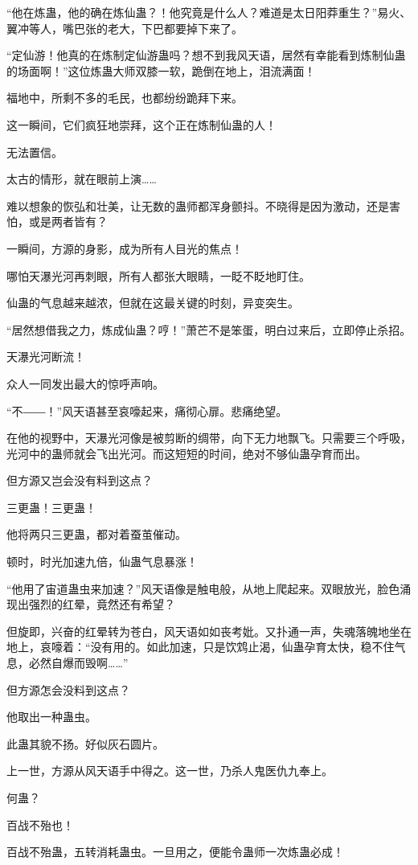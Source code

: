 \begin{this_body}
“他在炼蛊，他的确在炼仙蛊？！他究竟是什么人？难道是太日阳莽重生？”易火、翼冲等人，嘴巴张的老大，下巴都要掉下来了。

“定仙游！他真的在炼制定仙游蛊吗？想不到我风天语，居然有幸能看到炼制仙蛊的场面啊！”这位炼蛊大师双膝一软，跪倒在地上，泪流满面！

福地中，所剩不多的毛民，也都纷纷跪拜下来。

这一瞬间，它们疯狂地崇拜，这个正在炼制仙蛊的人！

无法置信。

太古的情形，就在眼前上演……

难以想象的恢弘和壮美，让无数的蛊师都浑身颤抖。不晓得是因为激动，还是害怕，或是两者皆有？

一瞬间，方源的身影，成为所有人目光的焦点！

哪怕天瀑光河再刺眼，所有人都张大眼睛，一眨不眨地盯住。

仙蛊的气息越来越浓，但就在这最关键的时刻，异变突生。

“居然想借我之力，炼成仙蛊？哼！”萧芒不是笨蛋，明白过来后，立即停止杀招。

天瀑光河断流！

众人一同发出最大的惊呼声响。

“不――！”风天语甚至哀嚎起来，痛彻心扉。悲痛绝望。

在他的视野中，天瀑光河像是被剪断的绸带，向下无力地飘飞。只需要三个呼吸，光河中的蛊师就会飞出光河。而这短短的时间，绝对不够仙蛊孕育而出。

但方源又岂会没有料到这点？

三更蛊！三更蛊！

他将两只三更蛊，都对着蚕茧催动。

顿时，时光加速九倍，仙蛊气息暴涨！

“他用了宙道蛊虫来加速？”风天语像是触电般，从地上爬起来。双眼放光，脸色涌现出强烈的红晕，竟然还有希望？

但旋即，兴奋的红晕转为苍白，风天语如如丧考妣。又扑通一声，失魂落魄地坐在地上，哀嚎着：“没有用的。如此加速，只是饮鸩止渴，仙蛊孕育太快，稳不住气息，必然自爆而毁啊……”

但方源怎会没料到这点？

他取出一种蛊虫。

此蛊其貌不扬。好似灰石圆片。

上一世，方源从风天语手中得之。这一世，乃杀人鬼医仇九奉上。

何蛊？

百战不殆也！

百战不殆蛊，五转消耗蛊虫。一旦用之，便能令蛊师一次炼蛊必成！


\end{this_body}

